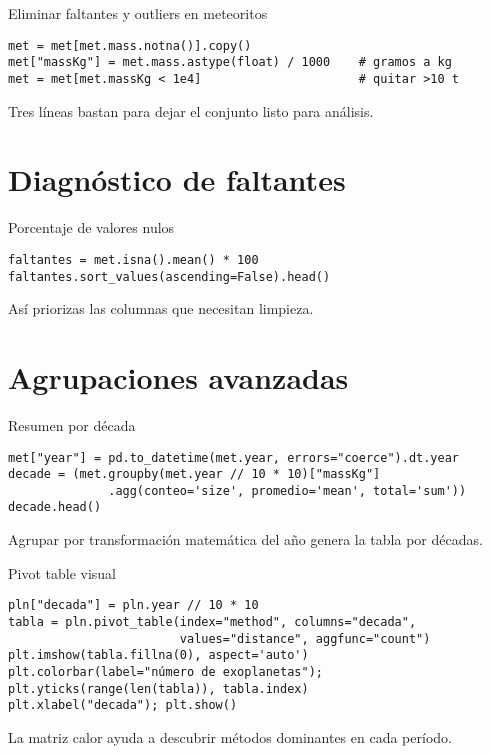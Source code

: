 \documentclass[10pt]{beamer}
\begin{document}
\begin{frame}[fragile]{Eliminar faltantes y outliers en meteoritos}
\begin{verbatim}
met = met[met.mass.notna()].copy()
met["massKg"] = met.mass.astype(float) / 1000    # gramos a kg
met = met[met.massKg < 1e4]                      # quitar >10 t
\end{verbatim}
Tres líneas bastan para dejar el conjunto listo para análisis.
\end{frame}

\section{Diagnóstico de faltantes}
\begin{frame}[fragile]{Porcentaje de valores nulos}
\begin{verbatim}
faltantes = met.isna().mean() * 100
faltantes.sort_values(ascending=False).head()
\end{verbatim}
Así priorizas las columnas que necesitan limpieza.
\end{frame}

\section{Agrupaciones avanzadas}
\begin{frame}[fragile]{Resumen por década}
\begin{verbatim}
met["year"] = pd.to_datetime(met.year, errors="coerce").dt.year
decade = (met.groupby(met.year // 10 * 10)["massKg"]
              .agg(conteo='size', promedio='mean', total='sum'))
decade.head()
\end{verbatim}
Agrupar por transformación matemática del año genera la tabla por décadas.
\end{frame}

\begin{frame}[fragile]{Pivot table visual}
\begin{verbatim}
pln["decada"] = pln.year // 10 * 10
tabla = pln.pivot_table(index="method", columns="decada",
                        values="distance", aggfunc="count")
plt.imshow(tabla.fillna(0), aspect='auto')
plt.colorbar(label="número de exoplanetas"); plt.yticks(range(len(tabla)), tabla.index)
plt.xlabel("decada"); plt.show()
\end{verbatim}
La matriz calor ayuda a descubrir métodos dominantes en cada período.
\end{frame}
\end{document}
